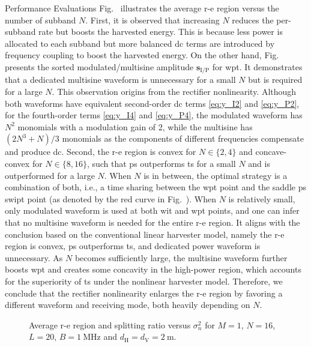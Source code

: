 \begin{section}{Performance Evaluations}
	Fig.~ illustrates the average \gls{r-e} region versus the number of subband $N$. First, it is observed that increasing $N$ reduces the per-subband rate but boosts the harvested energy. This is because less power is allocated to each subband but more balanced \gls{dc} terms are introduced by frequency coupling to boost the harvested energy. On the other hand, Fig.~ presents the sorted modulated/multisine amplitude $\boldsymbol{s}_{\mathrm{I/P}}$ for \gls{wpt}. It demonstrates that a dedicated multisine waveform is unnecessary for a small $N$ but is required for a large $N$. This observation origins from the rectifier nonlinearity. Although both waveforms have equivalent second-order \gls{dc} terms \eqref{eq:y_I2} and \eqref{eq:y_P2}, for the fourth-order terms \eqref{eq:y_I4} and \eqref{eq:y_P4}, the modulated waveform has $N^2$ monomials with a modulation gain of \num{2}, while the multisine has $(2N^3+N)/3$ monomials as the components of different frequencies compensate and produce \gls{dc}. Second, the \gls{r-e} region is convex for $N \in \{2,4\}$ and concave-convex for $N \in \{8,16\}$, such that \gls{ps} outperforms \gls{ts} for a small $N$ and is outperformed for a large $N$. When $N$ is in between, the optimal strategy is a combination of both, i.e., a time sharing between the \gls{wpt} point and the saddle \gls{ps} \gls{swipt} point (as denoted by the red curve in Fig.~). When $N$ is relatively small, only modulated waveform is used at both \gls{wit} and \gls{wpt} points, and one can infer that no multisine waveform is needed for the entire \gls{r-e} region. It aligns with the conclusion based on the conventional linear harvester model, namely the \gls{r-e} region is convex, \gls{ps} outperforms \gls{ts}, and dedicated power waveform is unnecessary. As $N$ becomes sufficiently large, the multisine waveform further boosts \gls{wpt} and creates some concavity in the high-power region, which accounts for the superiority of \gls{ts} under the nonlinear harvester model. Therefore, we conclude that the rectifier nonlinearity enlarges the \gls{r-e} region by favoring a different waveform and receiving mode, both heavily depending on $N$.

	\begin{figure}[!t]
		\centering
		\caption{Average \gls{r-e} region and splitting ratio versus $\sigma_n^2$ for $M=1$, $N=16$, $L=20$, $B=\qty{1}{\MHz}$ and $d_{\mathrm{H}}=d_{\mathrm{V}}=\qty{2}{\meter}$.}
	\end{figure}


\end{section}

